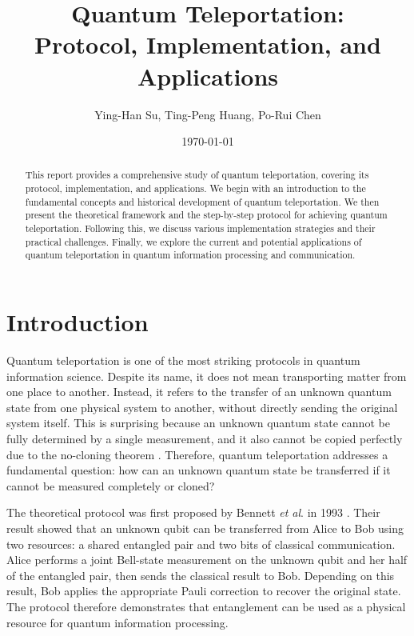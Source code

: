 \documentclass[aps,prd,preprint,floats,epsf,superscriptaddress,nofootinbib]{revtex4}
\begin{document}
\bigskip
\title{\bf Quantum Teleportation: \\ Protocol, Implementation, and Applications}
\bigskip

\author{Ying-Han Su, Ting-Peng Huang, Po-Rui Chen}

\date{\today}

\begin{abstract}
This report provides a comprehensive study of quantum teleportation, covering its protocol, implementation, and applications. We begin with an introduction to the fundamental concepts and historical development of quantum teleportation. We then present the theoretical framework and the step-by-step protocol for achieving quantum teleportation. Following this, we discuss various implementation strategies and their practical challenges. Finally, we explore the current and potential applications of quantum teleportation in quantum information processing and communication.
\end{abstract}

\maketitle

\tableofcontents


\newpage

\section{Introduction}
\label{sec:introduction}
Quantum teleportation is one of the most striking protocols in quantum information science. Despite its name, it does not mean transporting matter from one place to another. Instead, it refers to the transfer of an unknown quantum state from one physical system to another, without directly sending the original system itself. This is surprising because an unknown quantum state cannot be fully determined by a single measurement, and it also cannot be copied perfectly due to the no-cloning theorem \cite{Wootters1982,Dieks1982}. Therefore, quantum teleportation addresses a fundamental question: how can an unknown quantum state be transferred if it cannot be measured completely or cloned?

The theoretical protocol was first proposed by Bennett \textit{et al}. in 1993 \cite{Bennett}. Their result showed that an unknown qubit can be transferred from Alice to Bob using two resources: a shared entangled pair and two bits of classical communication. Alice performs a joint Bell-state measurement on the unknown qubit and her half of the entangled pair, then sends the classical result to Bob. Depending on this result, Bob applies the appropriate Pauli correction to recover the original state. The protocol therefore demonstrates that entanglement can be used as a physical resource for quantum information processing.
\end{document}
